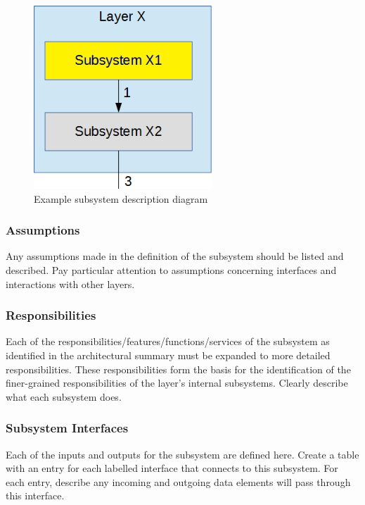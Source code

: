 \begin{figure}[h!]
	\centering
 	\includegraphics[width=0.60\textwidth]{images/subsystem}
 \caption{Example subsystem description diagram}
\end{figure}

\subsubsection{Assumptions}
Any assumptions made in the definition of the subsystem should be listed and described. Pay particular attention to assumptions concerning interfaces and interactions with other layers.

\subsubsection{Responsibilities}
Each of the responsibilities/features/functions/services of the subsystem as identified in the architectural summary must be expanded to more detailed responsibilities. These responsibilities form the basis for the identification of the finer-grained responsibilities of the layer's internal subsystems. Clearly describe what each subsystem does.

\subsubsection{Subsystem Interfaces}
Each of the inputs and outputs for the subsystem are defined here. Create a table with an entry for each labelled interface that connects to this subsystem. For each entry, describe any incoming and outgoing data elements will pass through this interface.

